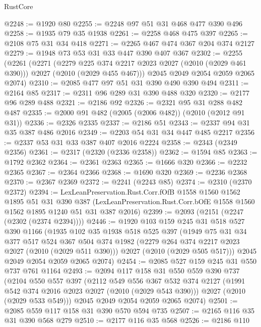 \begin{lexlean}{RustCore}
\begin{coremodule}
@2248 := @1920 @80
@2255 := @2248 @97 @51 @31 @468 @477 @390 @496
@2258 := @1935 @79 @35 @1938
@2261 := @2258 @468 @475 @397
@2265 := @2108 @75 @31 @34 @418
@2271 := @2265 @467 @474 @367 @204 @374 @2127
@2279 := @1948 @73 @53 @31 @33 @447 @390 @407 @367
@2302 := @2255
    (@2261
      (@2271
        (@2279 @225 @374 @2217 @2023 @2027 (@2010 (@2029 @461 @390)))
        @2027
        (@2010 (@2029 @455 @467)))
      @2045
      @2049
      @2054
      @2059
      @2065
      @2074)
@2310 := @2085 @477 @97 @51 @31 @390 @490 @390 @494
@2311 := @2164 @85
@2317 := @2311 @96 @289 @31 @390 @488 @320
@2320 := @2177 @96 @289 @488
@2321 := @2186 @92
@2326 := @2321 @95 @31 @288 @482 @487
@2335 := @2000 @91 @482 (@2005 (@2006 @482)) (@2010 (@2012 @91 @31))
@2336 := @2326 @2335
@2337 := @2186 @51
@2343 := @2337 @94 @31 @35 @387 @486 @2016
@2349 := @2203 @54 @31 @34 @447 @485 @2217
@2356 := @2337 @53 @31 @33 @387 @407 @2016 @2224
@2358 := @2343 (@2349 @2356)
@2361 := @2317 (@2320 (@2336 @2358))
@2362 := @1594 @85
@2363 := @1792 @2362
@2364 := @2361 @2363
@2365 := @1666 @320
@2366 := @2232 @2365
@2367 := @2364 @2366
@2368 := @1690 @320
@2369 := @2236 @2368
@2370 := @2367 @2369
@2372 := @2241 (@2243 @85)
@2374 := @2310 (@2370 @2372)
@2394 := LexLeanPreservation.Rust.Corr.fOfB
    @1558
    @1560
    @1562
    @1895
    @51
    @31
    @390
    @387
    (LexLeanPreservation.Rust.Corr.bOfE @1558 @1560 @1562 @1895 @1240 @51 @31 @387 @2016)
@2399 := @2093 (@2151 (@2247 (@2302 (@2374 @2394))))
@2446 := @1920
    @103
    @159
    @245
    @31
    @518
    @527
    @390
    @1166
    (@1935
      @102
      @35
      @1938
      @518
      @525
      @397
      (@1949
        @75
        @31
        @34
        @377
        @517
        @524
        @367
        @504
        @374
        @1982
        (@2279 @264 @374 @2217 @2023 @2027 (@2010 (@2029 @511 @390)))
        @2027
        (@2010 (@2029 @505 @517)))
      @2045
      @2049
      @2054
      @2059
      @2065
      @2074)
@2454 := @2085 @527 @159 @245 @31 @550 @737 @761 @1164
@2493 := @2094
    @117
    @158
    @31
    @550
    @559
    @390
    @737
    (@2104
      @550
      @557
      @397
      (@2112
        @549
        @556
        @367
        @532
        @374
        @2127
        (@1991 @542 @374 @2016 @2023 @2027 (@2010 (@2029 @543 @390)))
        @2027
        (@2010 (@2029 @533 @549)))
      @2045
      @2049
      @2054
      @2059
      @2065
      @2074)
@2501 := @2085 @559 @117 @158 @31 @390 @570 @594 @735
@2507 := @2165 @116 @35 @31 @390 @568 @279
@2510 := @2177 @116 @35 @568
@2526 := @2186
    @110

\end{coremodule}
\end{lexlean}
